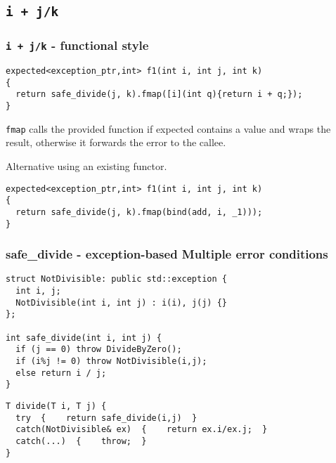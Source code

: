 \documentclass[xcolor=dvipsnames]{beamer}
\newcommand{\cpp}[1]{\lstinline{#1}}
\begin{document}
\subsection{\cpp{i + j/k}}
\begin{frame}[fragile]
\frametitle{\cpp{i + j/k}  - functional style}

\begin{lstlisting}
expected<exception_ptr,int> f1(int i, int j, int k)
{
  return safe_divide(j, k).fmap([i](int q){return i + q;});
}
\end{lstlisting}

\cpp{fmap}  calls the provided function if expected contains a value and wraps the result, otherwise it forwards the error to the callee. 

Alternative using an existing functor.

\begin{lstlisting}
expected<exception_ptr,int> f1(int i, int j, int k)
{
  return safe_divide(j, k).fmap(bind(add, i, _1)));
}
\end{lstlisting}
\end{frame}
\begin{frame}[fragile]
\frametitle{safe\_divide  - exception-based Multiple error conditions}

\begin{lstlisting}
struct NotDivisible: public std::exception {
  int i, j;
  NotDivisible(int i, int j) : i(i), j(j) {}
};

int safe_divide(int i, int j) {
  if (j == 0) throw DivideByZero(); 
  if (i%j != 0) throw NotDivisible(i,j);
  else return i / j; 
}
\end{lstlisting}

\begin{lstlisting}
T divide(T i, T j) {
  try  {    return safe_divide(i,j)  }
  catch(NotDivisible& ex)  {    return ex.i/ex.j;  }
  catch(...)  {    throw;  }
}
\end{lstlisting}
\end{frame}
\end{document}

